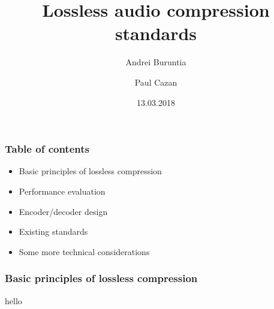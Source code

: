 \documentclass{beamer}
\title{Lossless audio compression standards}
\author{Andrei Buruntia\\
	\and
	Paul Cazan}
\date{13.03.2018 }
\begin{document}
\maketitle

\begin{frame}
\frametitle{Table of contents}

\begin{itemize}
\item{Basic principles of lossless compression}
\item{Performance evaluation}
\item{Encoder/decoder design}
\item{Existing standards}
\item{Some more technical considerations}
\end{itemize}

\end{frame}

\begin{frame}
\frametitle{Basic principles of lossless compression}

hello

\end{frame}
\end{document}
